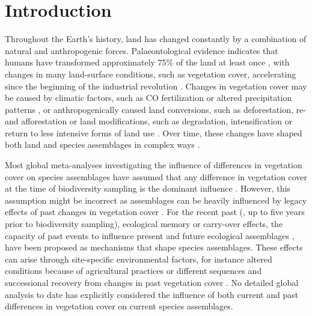 \section{Introduction}
\label{C02_01}
Throughout the Earth's history, land has changed constantly by a combination of natural and anthropogenic forces. Palaeontological evidence indicates that humans have transformed approximately 75\% of the land at least once \citep{Ellis2010,Ellis2011}, with changes in many land-surface conditions, such as vegetation cover, accelerating since the beginning of the industrial revolution \citep{Lambin2006,Steffen2015}. Changes in vegetation cover may be caused by climatic factors, such as CO fertilization or altered precipitation patterns \citep{Zhu2016}, or anthropogenically caused land conversions, such as deforestation, re- and afforestation \citep{Dupont2003,Hansen2013,Muller2014} or land modifications, such as degradation, intensification \citep{Gibbs2015,Rufin2015} or return to less intensive forms of land use \citep{Zomer2016}. Over time, these changes have shaped both land and species assemblages in complex ways \citep{Foster2003,Watson2014,Perring2015}.

Most global meta-analyses investigating the influence of differences in vegetation cover on species assemblages have assumed that any difference in vegetation cover at the time of biodiversity sampling is the dominant influence
\citep{Stein2014, Newbold2014b, Newbold2015, Alroy2017}. However, this assumption might be incorrect as assemblages can be heavily influenced by legacy effects of past changes in vegetation cover \citep{Foster2003, Watson2014, Ogle2015, Perring2015}. For the recent past (\eg, up to five years prior to biodiversity sampling), ecological memory or carry-over effects, \ie the capacity of past events to influence present and future ecological assemblages \citep{Harrison2011, OConnor2014, Ogle2015}, have been proposed as mechanisms that shape species assemblages. These effects can arise through site-specific environmental factors, for instance altered conditions because of agricultural practices \citep{Perring2015,Perring2018} or different sequences and successional recovery from changes in past vegetation cover \citep{Johnson2008,Walker2010,Watson2014}. No detailed global analysis to date has explicitly considered the influence of both current and past differences in vegetation cover on current species assemblages.

